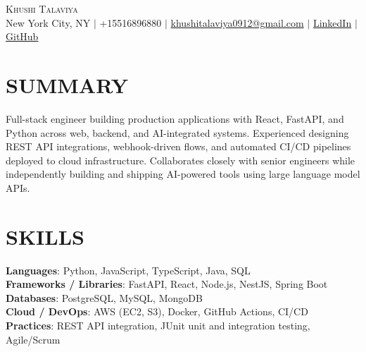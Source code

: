 \documentclass[letterpaper,11pt]{article}
\begin{document}
\begin{center}
    {\Huge \scshape Khushi Talaviya} \\ \vspace{2pt}
    \vspace{4pt}
    \small
    New York City, NY $|$
    \small
    +15516896880 $|$
    \href{mailto:khushitalaviya0912@gmail.com}{khushitalaviya0912@gmail.com} $|$
    \href{https://www.linkedin.com/in/khushitalaviya/}{LinkedIn} $|$
    \href{https://github.com/talaviyakhushi}{GitHub}
\end{center}

\section{SUMMARY}
\vspace{5pt}
\small{Full-stack engineer building production applications with React, FastAPI, and Python across web, backend, and AI-integrated systems. Experienced designing REST API integrations, webhook-driven flows, and automated CI/CD pipelines deployed to cloud infrastructure. Collaborates closely with senior engineers while independently building and shipping AI-powered tools using large language model APIs.}

\vspace{2pt}
\section{SKILLS}
\vspace{5pt}
\begin{itemize}[leftmargin=0in, label={}]
\small{\item{
\textbf{Languages}{: Python, JavaScript, TypeScript, Java, SQL} \\
\textbf{Frameworks / Libraries}{: FastAPI, React, Node.js, NestJS, Spring Boot} \\
\textbf{Databases}{: PostgreSQL, MySQL, MongoDB} \\
\textbf{Cloud / DevOps}{: AWS (EC2, S3), Docker, GitHub Actions, CI/CD} \\
\textbf{Practices}{: REST API integration, JUnit unit and integration testing, Agile/Scrum}
}}
\end{itemize}
\vspace{-10pt}

\end{document}
